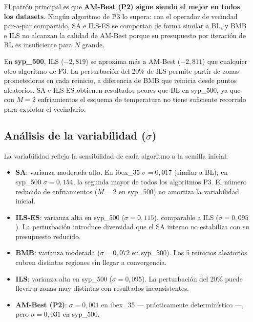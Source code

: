 \documentclass[12pt,a4paper]{article}
\begin{document}
El patrón principal es que \textbf{AM-Best (P2) sigue siendo el mejor en todos los
datasets}. Ningún algoritmo de P3 lo supera: con el operador de vecindad par-a-par
compartido, SA e ILS-ES se comportan de forma similar a BL, y BMB e ILS no alcanzan
la calidad de AM-Best porque su presupuesto por iteración de BL es insuficiente para
$N$ grande.

En \textbf{syp\_500}, ILS ($-2{,}819$) se aproxima más a AM-Best ($-2{,}811$) que
cualquier otro algoritmo de P3. La perturbación del 20\% de ILS permite partir de zonas
prometedoras en cada reinicio, a diferencia de BMB que reinicia desde puntos aleatorios.
SA e ILS-ES obtienen resultados peores que BL en syp\_500, ya que con $M=2$ enfriamientos
el esquema de temperatura no tiene suficiente recorrido para explotar el vecindario.

\subsection{Análisis de la variabilidad ($\sigma$)}

La variabilidad refleja la sensibilidad de cada algoritmo a la semilla inicial:

\begin{itemize}
  \item \textbf{SA}: varianza moderada-alta. En ibex\_35 $\sigma=0{,}017$ (similar a BL);
  en syp\_500 $\sigma=0{,}154$, la segunda mayor de todos los algoritmos P3. El número
  reducido de enfriamientos ($M=2$ en syp\_500) no amortiza la variabilidad inicial.

  \item \textbf{ILS-ES}: varianza alta en syp\_500 ($\sigma=0{,}115$), comparable a ILS
  ($\sigma=0{,}095$). La perturbación introduce diversidad que el SA interno no estabiliza
  con su presupuesto reducido.

  \item \textbf{BMB}: varianza moderada ($\sigma=0{,}072$ en syp\_500). Los 5 reinicios
  aleatorios cubren distintas regiones sin llegar a convergencia.

  \item \textbf{ILS}: varianza alta en syp\_500 ($\sigma=0{,}095$). La perturbación del
  20\% puede llevar a zonas muy distintas con resultados inconsistentes.

  \item \textbf{AM-Best (P2)}: $\sigma=0{,}001$ en ibex\_35 — prácticamente
  determinístico —, pero $\sigma=0{,}031$ en syp\_500.
\end{itemize}
\end{document}
